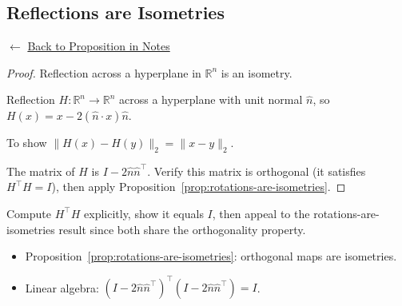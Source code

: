 
\subsection*{Reflections are Isometries}
\label{prf:reflections-are-isometries}

\begin{remark*}[Return]
$\leftarrow$ \hyperref[prop:reflections-are-isometries]{Back to Proposition in Notes}
\end{remark*}

\begin{proof}
\Claim Reflection across a hyperplane in $\mathbb{R}^n$ is an isometry.

\Given Reflection $H : \mathbb{R}^n \to \mathbb{R}^n$ across a hyperplane
with unit normal $\hat{n}$, so $H(x) = x - 2(\hat{n} \cdot x)\hat{n}$.

\Goal To show $\|H(x) - H(y)\|_2 = \|x - y\|_2$.

\Strategy The matrix of $H$ is $I - 2\hat{n}\hat{n}^\top$.
Verify this matrix is orthogonal (it satisfies $H^\top H = I$),
then apply Proposition~\ref{prop:rotations-are-isometries}.


\end{proof}

\begin{remark*}
Compute $H^\top H$ explicitly, show it equals $I$, then appeal to
the rotations-are-isometries result since both share the orthogonality property.
\end{remark*}

\begin{remark*}[Dependencies]
\begin{itemize}
  \item Proposition~\ref{prop:rotations-are-isometries}: orthogonal maps are isometries.
  \item Linear algebra: $(I - 2\hat{n}\hat{n}^\top)^\top(I - 2\hat{n}\hat{n}^\top) = I$.
\end{itemize}
\end{remark*}

